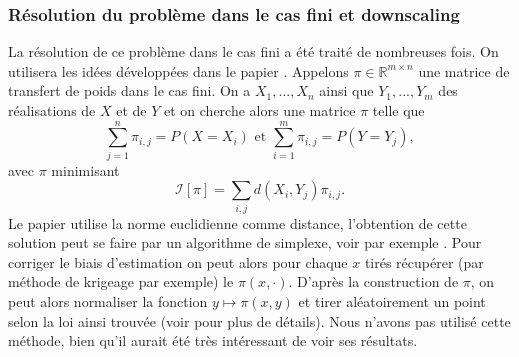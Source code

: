 \documentclass[a4paper,11pt]{article}
\numberwithin{equation}{section}
\begin{document}
\subsubsection{Résolution du problème dans le cas fini et downscaling}
La résolution de ce problème dans le cas fini a été traité de nombreuses fois. On utilisera les idées développées dans le papier \cite{robin2019multivariate}. Appelons $\pi \in \mathbb{R}^{m\times n}$ une matrice de transfert de poids dans le cas fini. On a $X_1,...,X_n$ ainsi que $Y_1,...,Y_m$ des réalisations de $X$ et de $Y$ et on cherche alors une matrice $\pi$ telle que 
\[\sum_{j=1}^{n} \pi_{i,j}= P(X=X_i) \textrm{ et } \sum_{i=1}^{m} \pi_{i,j}= P(Y=Y_j),\]
avec $\pi$ minimisant 
\[\mathcal{I}[\pi]=\sum_{i,j}d(X_i,Y_j)\pi_{i,j}.\]  
Le papier \cite{robin2019multivariate} utilise la norme euclidienne comme distance, l'obtention de cette solution peut se faire par un algorithme de simplexe, voir par exemple \cite{huang2012optimal}. Pour corriger le biais d'estimation on peut alors pour chaque $x$ tirés récupérer (par méthode de krigeage par exemple) le $\pi(x,\cdot)$. D'après la construction de $\pi$, on peut alors normaliser la fonction $y\mapsto \pi(x,y)$ et tirer aléatoirement un point selon la loi ainsi trouvée (voir \cite{robin2019multivariate} pour plus de détails). Nous n'avons pas utilisé cette méthode, bien qu'il aurait été très intéressant de voir ses résultats.
\end{document}
